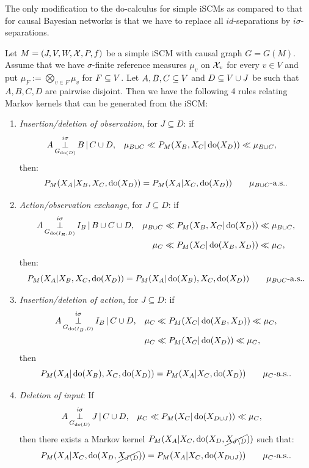 The only modification to the do-calculus for simple iSCMs as compared to that for causal Bayesian networks is that
we have to replace all $id$-separations by $i\sigma$-separations.
\begin{Thm}\label{thm:as-do-calculus-scms-simplified}
  Let $M = \left ( J, V, W, \mathcal{X}, P, f \right )$ be a simple iSCM with causal graph $G = G(M)$.
  Assume that we have $\sigma$-finite reference measures $\mu_v$ on $\mathcal{X}_v$ for every $v \in V$
  and put $\mu_F := \bigotimes_{v \in F} \mu_v$ for $F \subseteq V$.
  Let $A,B,C \subseteq V$ and $D \subseteq V \cup J$ be such that $A,B,C,D$ are pairwise disjoint.
  Then we have the following 4 rules relating Markov kernels that can be generated from the iSCM:
  \begin{enumerate}
      \item \emph{Insertion/deletion of observation}, for $J \subseteq D$: if
       \begin{align*} 
           A &\operatorname*{\perp}^{i\sigma}_{G_{\operatorname{do}(D)}} B \operatorname*{|} C \cup D, &
           \mu_{B \cup C} &\ll P_M(X_B,X_C|\operatorname{do}(X_{D}))\ll \mu_{B \cup C},
       \end{align*}
        then:
          \[ P_M(X_A|X_B,X_C,\operatorname{do}(X_{D})) = P_M(X_A|X_C,\operatorname{do}(X_{D})) \qquad \mu_{B \cup C}\text{-a.s.}.\]
     \item \emph{Action/observation exchange}, for $J \subseteq D$: if
       \begin{align*} 
           A & \operatorname*{\perp}^{i\sigma}_{G_{\operatorname{do}(I_B,D)}} I_B \operatorname*{|} B \cup C \cup D, &          
                  \mu_{B \cup C} &\ll  P_M(X_B,X_C|\operatorname{do}(X_{D})) \ll \mu_{B \cup C},\\
               &&   \mu_C &\ll  P_M(X_C|\operatorname{do}(X_B,X_{D})) \ll \mu_C,
       \end{align*}
        then:
       \[ P_M(X_A|X_B,X_C,\operatorname{do}(X_{D}))  = P_M(X_A|\operatorname{do}(X_B),X_C,\operatorname{do}(X_{D})) \qquad \mu_{B \cup C}\text{-a.s.}.\]
     \item \emph{Insertion/deletion of action}, for $J \subseteq D$: if
       \begin{align*} 
           A &\operatorname*{\perp}^{i\sigma}_{G_{\operatorname{do}(I_B,D)}} I_B \operatorname*{|} C  \cup D, &          
           \mu_C &\ll P_M(X_C|\operatorname{do}(X_B,X_{D})) \ll \mu_C, \\
                 && \mu_C &\ll P_M(X_C|\operatorname{do}(X_{D})) \ll \mu_C,
       \end{align*}
       then
       \[ P_M(X_A|\operatorname{do}(X_B),X_C,\operatorname{do}(X_{D})) = P_M(X_A|X_C,\operatorname{do}(X_{D})) \qquad \mu_C\text{-a.s.}.\]
     \item \emph{Deletion of input}: 
         If 
         \begin{align*} 
           A &\operatorname*{\perp}^{i\sigma}_{G_{\operatorname{do}(D)}} J \operatorname*{|} C \cup D, &
             \mu_C &\ll P_M(X_C|\operatorname{do}(X_{D\cup J})) \ll \mu_C,
         \end{align*}
         then there exists a Markov kernel $P_M(X_A|X_C,\operatorname{do}(X_{D},\cancel{X_{J\setminus D}}))$ such that:
         \[ P_M(X_A|X_C,\operatorname{do}(X_{D},\cancel{X_{J\setminus D}})) = P_M(X_A|X_C,\operatorname{do}(X_{D \cup J})) \qquad \mu_C\text{-a.s.}. \]
    \end{enumerate}
\end{Thm}
